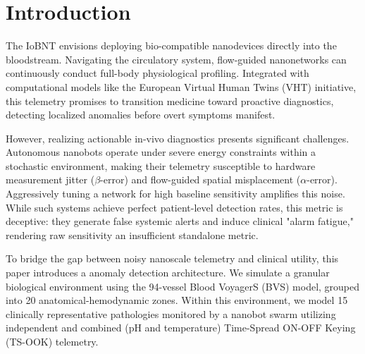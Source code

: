 \documentclass[sigconf]{acmart}
\begin{document}


\maketitle

\section{Introduction}

The IoBNT envisions deploying bio-compatible nanodevices directly into the bloodstream. Navigating the circulatory system, flow-guided nanonetworks can continuously conduct full-body physiological profiling. Integrated with computational models like the European Virtual Human Twins (VHT) initiative, this telemetry promises to transition medicine toward proactive diagnostics, detecting localized anomalies before overt symptoms manifest.

However, realizing actionable in-vivo diagnostics presents significant challenges. Autonomous nanobots operate under severe energy constraints within a stochastic environment, making their telemetry susceptible to hardware measurement jitter ($\beta$-error) and flow-guided spatial misplacement ($\alpha$-error). Aggressively tuning a network for high baseline sensitivity amplifies this noise. While such systems achieve perfect patient-level detection rates, this metric is deceptive: they generate false systemic alerts and induce clinical "alarm fatigue," rendering raw sensitivity an insufficient standalone metric.

To bridge the gap between noisy nanoscale telemetry and clinical utility, this paper introduces a anomaly detection architecture. We simulate a granular biological environment using the 94-vessel Blood VoyagerS (BVS) model, grouped into 20 anatomical-hemodynamic zones. Within this environment, we model 15 clinically representative pathologies monitored by a nanobot swarm utilizing independent and combined (pH and temperature) Time-Spread ON-OFF Keying (TS-OOK) telemetry. 
\end{document}
